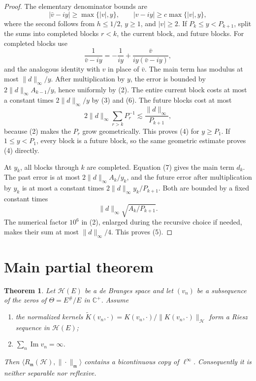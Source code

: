 \documentclass[11pt]{article}
\newtheorem{theorem}{Theorem}
\newcommand{\Hc}{\mathcal H}
\newcommand{\Rm}{R_{\mathfrak m}}
\newcommand{\C}{\mathbb C}
\newcommand{\linf}{\ell^\infty}
\begin{document}
\begin{proof}
The elementary denominator bounds are
\[
 |\bar v-iy|\ge\max\{|v|,y\},
 \qquad |v-iy|\ge c\max\{|v|,y\},                        \tag{6}
\]
where the second follows from $h\le1/2$, $y\ge1$, and $|v|\ge2$.
If $P_k\le y<P_{k+1}$, split the sums into completed blocks $r<k$, the
current block, and future blocks.  For completed blocks use
\[
 \frac1{\bar v-iy}=-\frac1{iy}
 +\frac{\bar v}{iy(\bar v-iy)},                            \tag{7}
\]
and the analogous identity with $v$ in place of $\bar v$.
The main term has modulus at most $\|d\|_\infty/y$.  After multiplication
by $y$, the error is bounded by
$2\|d\|_\infty A_{k-1}/y$, hence uniformly by (2).  The entire current
block costs at most a constant times $2\|d\|_\infty/y$ by (3) and (6).
The future blocks cost at most
\[
 2\|d\|_\infty\sum_{r>k}P_r^{-1}\lesssim
 \frac{\|d\|_\infty}{P_{k+1}},
\]
because (2) makes the $P_r$ grow geometrically.  This proves (4) for
$y\ge P_1$.  If $1\le y<P_1$, every block is a future block, so the same
geometric estimate proves (4) directly.

At $y_k$, all blocks through $k$ are completed.  Equation (7) gives the
main term $d_k$.  The past error is at most
$2\|d\|_\infty A_k/y_k$, and the future error after multiplication by
$y_k$ is at most a constant times
$2\|d\|_\infty y_k/P_{k+1}$.  Both are bounded by a fixed constant times
\[
 \|d\|_\infty\sqrt{A_k/P_{k+1}}.
\]
The numerical factor $10^6$ in (2), enlarged during the recursive choice if
needed, makes their sum at most $\|d\|_\infty/4$.  This proves (5).
\end{proof}

\section{Main partial theorem}

\begin{theorem}\label{thm:main}
Let $\Hc(E)$ be a de Branges space and let $(v_n)$ be a subsequence of the
zeros of $\Theta=E^\#/E$ in $\C^+$.  Assume
\begin{enumerate}
\item the normalized kernels
$\widetilde K(v_n,\cdot)=K(v_n,\cdot)/\|K(v_n,\cdot)\|_{\Hc}$
form a Riesz sequence in $\Hc(E)$;
\item $\sum_n\operatorname{Im}v_n=\infty$.
\end{enumerate}
Then $\langle\Rm(\Hc),\|\cdot\|_{\mathfrak m}\rangle$ contains a
bicontinuous copy of $\linf$.  Consequently it is neither separable nor
reflexive.
\end{theorem}
\end{document}
